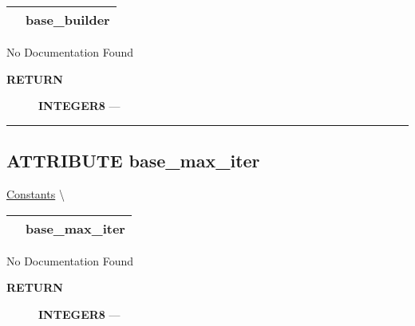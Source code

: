 {\renewcommand{\arraystretch}{1.5}
\begin{tabularx}{\textwidth}{|>{\raggedright\arraybackslash}l|X|}
\hline
\hspace{0pt}\mytexttt{\color{red} } & \textbf{base\_builder} \\
\hline
\end{tabularx}
}

\par





No Documentation Found








\par
\begin{description}
\item [\colorbox{tagtype}{\color{white} \textbf{\textsf{RETURN}}}] \textbf{INTEGER8} --- 
\end{description}




\rule{\linewidth}{0.5pt}
\subsection*{\textsf{\colorbox{headtoc}{\color{white} ATTRIBUTE}
base\_max\_iter}}

\hypertarget{ecldoc:constants.base_max_iter}{}
\hspace{0pt} \hyperlink{ecldoc:Constants}{Constants} \textbackslash 

{\renewcommand{\arraystretch}{1.5}
\begin{tabularx}{\textwidth}{|>{\raggedright\arraybackslash}l|X|}
\hline
\hspace{0pt}\mytexttt{\color{red} } & \textbf{base\_max\_iter} \\
\hline
\end{tabularx}
}

\par





No Documentation Found








\par
\begin{description}
\item [\colorbox{tagtype}{\color{white} \textbf{\textsf{RETURN}}}] \textbf{INTEGER8} --- 
\end{description}




